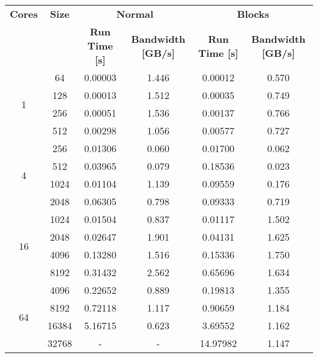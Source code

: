 \begin{tabularx}{\textwidth}{@{} c c c c c c @{}}
    \caption{\label{table:scale-weak}Weak scaling}\\
    \toprule
        \textbf{Cores} & \textbf{Size} & \multicolumn{2}{c}{\textbf{Normal}} & \multicolumn{2}{c}{\textbf{Blocks}}\\
        \cmidrule(lr){3-4}\cmidrule(lr){5-6}
        & & \textbf{Run Time [s]} & \textbf{Bandwidth [GB/s]} & \textbf{Run Time [s]} & \textbf{Bandwidth [GB/s]} \\
    \midrule
    \endhead
        \multirow{4}{*}{1} & 64  & 0.00003 & 1.446 & 0.00012 & 0.570 \\
                           & 128 & 0.00013 & 1.512 & 0.00035 & 0.749 \\
                           & 256 & 0.00051 & 1.536 & 0.00137 & 0.766 \\
                           & 512 & 0.00298 & 1.056 & 0.00577 & 0.727 \\
    \midrule
        \multirow{4}{*}{4} & 256  & 0.01306 & 0.060 & 0.01700 & 0.062 \\
                           & 512  & 0.03965 & 0.079 & 0.18536 & 0.023 \\
                           & 1024 & 0.01104 & 1.139 & 0.09559 & 0.176 \\
                           & 2048 & 0.06305 & 0.798 & 0.09333 & 0.719 \\
    \midrule
        \multirow{4}{*}{16} & 1024 & 0.01504 & 0.837 & 0.01117 & 1.502 \\
                            & 2048 & 0.02647 & 1.901 & 0.04131 & 1.625 \\
                            & 4096 & 0.13280 & 1.516 & 0.15336 & 1.750 \\
                            & 8192 & 0.31432 & 2.562 & 0.65696 & 1.634 \\
    \midrule
        \multirow{4}{*}{64} & 4096  & 0.22652 & 0.889 & 0.19813 & 1.355 \\
                            & 8192  & 0.72118 & 1.117 & 0.90659 & 1.184 \\
                            & 16384 & 5.16715 & 0.623 & 3.69552 & 1.162 \\
                            & 32768 & -       & -     & 14.97982 & 1.147 \\
    \bottomrule
\end{tabularx}    
